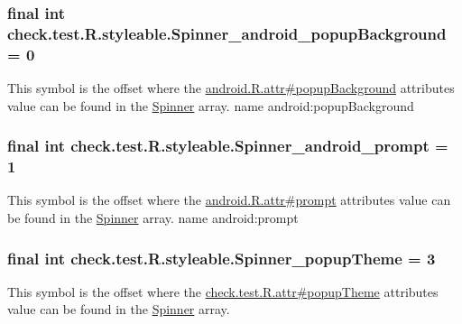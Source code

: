 \subsubsection[{Spinner\+\_\+android\+\_\+popup\+Background}]{\setlength{\rightskip}{0pt plus 5cm}final int check.\+test.\+R.\+styleable.\+Spinner\+\_\+android\+\_\+popup\+Background = 0\hspace{0.3cm}{\ttfamily [static]}}\label{classcheck_1_1test_1_1_r_1_1styleable_af3a17f8a0e3b61c605894eed3a35f9a4}
This symbol is the offset where the \hyperlink{}{android.\+R.\+attr\#popup\+Background} attribute\textquotesingle{}s value can be found in the \hyperlink{classcheck_1_1test_1_1_r_1_1styleable_ae9bbc621da309e840c0cacd528d5d439}{Spinner} array.  name android\+:popup\+Background \hypertarget{classcheck_1_1test_1_1_r_1_1styleable_af103d6b67bae0598aa2d77310b3aab0d}{}
\subsubsection[{Spinner\+\_\+android\+\_\+prompt}]{\setlength{\rightskip}{0pt plus 5cm}final int check.\+test.\+R.\+styleable.\+Spinner\+\_\+android\+\_\+prompt = 1\hspace{0.3cm}{\ttfamily [static]}}\label{classcheck_1_1test_1_1_r_1_1styleable_af103d6b67bae0598aa2d77310b3aab0d}
This symbol is the offset where the \hyperlink{}{android.\+R.\+attr\#prompt} attribute\textquotesingle{}s value can be found in the \hyperlink{classcheck_1_1test_1_1_r_1_1styleable_ae9bbc621da309e840c0cacd528d5d439}{Spinner} array.  name android\+:prompt \hypertarget{classcheck_1_1test_1_1_r_1_1styleable_a119cd6dc9855dc91a0bd24dd52b9ee01}{}
\subsubsection[{Spinner\+\_\+popup\+Theme}]{\setlength{\rightskip}{0pt plus 5cm}final int check.\+test.\+R.\+styleable.\+Spinner\+\_\+popup\+Theme = 3\hspace{0.3cm}{\ttfamily [static]}}\label{classcheck_1_1test_1_1_r_1_1styleable_a119cd6dc9855dc91a0bd24dd52b9ee01}
This symbol is the offset where the \hyperlink{classcheck_1_1test_1_1_r_1_1attr_a80b43c587b8929227394e17102b18eb4}{check.\+test.\+R.\+attr\#popup\+Theme} attribute\textquotesingle{}s value can be found in the \hyperlink{classcheck_1_1test_1_1_r_1_1styleable_ae9bbc621da309e840c0cacd528d5d439}{Spinner} array.

